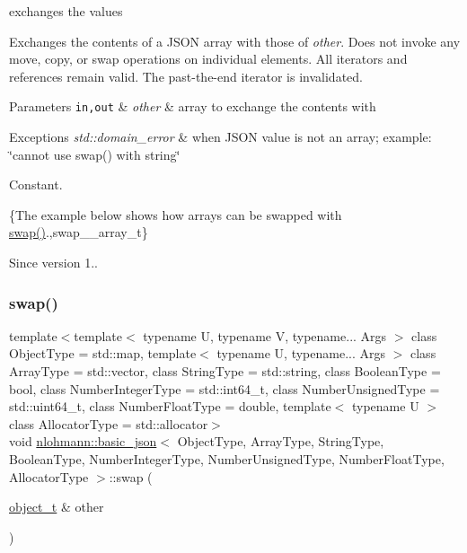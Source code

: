 exchanges the values 

Exchanges the contents of a J\+S\+ON array with those of {\itshape other}. Does not invoke any move, copy, or swap operations on individual elements. All iterators and references remain valid. The past-\/the-\/end iterator is invalidated.


\begin{DoxyParams}[1]{Parameters}
\mbox{\tt in,out}  & {\em other} & array to exchange the contents with\\
\hline
\end{DoxyParams}

\begin{DoxyExceptions}{Exceptions}
{\em std\+::domain\+\_\+error} & when J\+S\+ON value is not an array; example\+: {\ttfamily \char`\"{}cannot
use swap() with string\char`\"{}}\\
\hline
\end{DoxyExceptions}
Constant.

\{The example below shows how arrays can be swapped with {\ttfamily \hyperlink{classnlohmann_1_1basic__json_a2f774129440c427253dc97406e2d9010}{swap()}}.,swap\+\_\+\+\_\+array\+\_\+t\}

\begin{DoxySince}{Since}
version 1.. 
\end{DoxySince}
\hypertarget{classnlohmann_1_1basic__json_a38ee0f09a318d003add75e0787040794}{}\label{classnlohmann_1_1basic__json_a38ee0f09a318d003add75e0787040794} 
\subsubsection{\texorpdfstring{swap()}{swap()}\hspace{0.1cm}{\footnotesize\ttfamily [3/4]}}
{\footnotesize\ttfamily template$<$template$<$ typename U, typename V, typename... Args $>$ class Object\+Type = std\+::map, template$<$ typename U, typename... Args $>$ class Array\+Type = std\+::vector, class String\+Type  = std\+::string, class Boolean\+Type  = bool, class Number\+Integer\+Type  = std\+::int64\+\_\+t, class Number\+Unsigned\+Type  = std\+::uint64\+\_\+t, class Number\+Float\+Type  = double, template$<$ typename U $>$ class Allocator\+Type = std\+::allocator$>$ \\
void \hyperlink{classnlohmann_1_1basic__json}{nlohmann\+::basic\+\_\+json}$<$ Object\+Type, Array\+Type, String\+Type, Boolean\+Type, Number\+Integer\+Type, Number\+Unsigned\+Type, Number\+Float\+Type, Allocator\+Type $>$\+::swap (\begin{DoxyParamCaption}\item[{\hyperlink{classnlohmann_1_1basic__json_a0ac9894c9de8dc551cf2e5f1c605537f}{object\+\_\+t} \&}]{other }\end{DoxyParamCaption})\hspace{0.3cm}{\ttfamily [inline]}}



